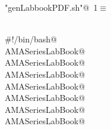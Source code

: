 \documentclass[hyperref]{labbook}
\begin{document}
\begin{flushleft} \small
\begin{minipage}{\linewidth}\label{scrap1}\raggedright\small
{} \verb@"genLabbookPDF.sh"@\nobreak\ {\footnotesize {1}}$\equiv$
\vspace{-1ex}
\begin{list}{}{} \item
\mbox{}\verb@@\\
\mbox{}\verb@#!/bin/bash@\\
\mbox{}\verb@nuweb  AMASeriesLabBook@\\
\mbox{}\verb@pdflatex  AMASeriesLabBook@\\
\mbox{}\verb@makeindex  AMASeriesLabBook@\\
\mbox{}\verb@bibtex  AMASeriesLabBook@\\
\mbox{}\verb@nuweb  AMASeriesLabBook@\\
\mbox{}\verb@pdflatex  AMASeriesLabBook@\\
\mbox{}\verb@pdflatex  AMASeriesLabBook@\\
\mbox{}\verb@@{\NWsep}
\end{list}
\vspace{-1.5ex}
\footnotesize
\begin{list}{}{\setlength{\itemsep}{-\parsep}\setlength{\itemindent}{-\leftmargin}}

\item{}
\end{list}
\end{minipage}\vspace{4ex}
\end{flushleft}
\end{document}
